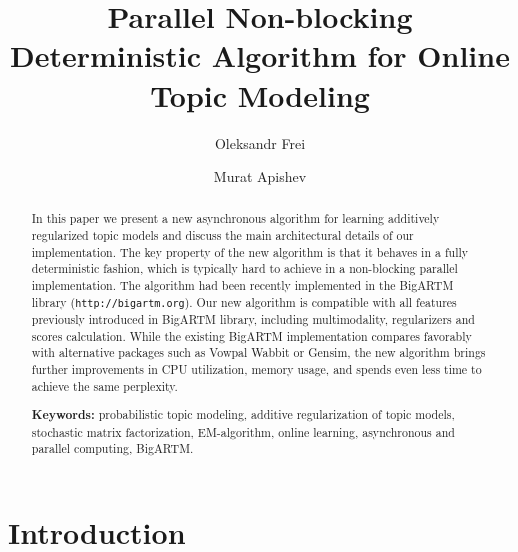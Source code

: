 \documentclass[russian,english]{llncs}
\begin{document}
\title{
    Parallel Non-blocking Deterministic Algorithm for Online Topic Modeling
}
\author{
    Oleksandr Frei
    \and
    Murat Apishev
}

\maketitle

\begin{abstract}
In this paper we present a new asynchronous algorithm for learning additively regularized topic models
and discuss the main architectural details of our implementation.
The key property of the new algorithm is that it behaves in a fully deterministic fashion,
which is typically hard to achieve in a non-blocking parallel implementation. The algorithm
had been
recently implemented in the BigARTM library (\texttt{http://bigartm.org}).
Our new algorithm is compatible with all features previously introduced in BigARTM library,
including multimodality, regularizers and scores calculation.
While the existing BigARTM implementation compares favorably
with alternative packages such as Vowpal Wabbit or Gensim,
the new algorithm brings further improvements in CPU utilization,
memory usage, and spends even less time to achieve the same perplexity.

\vspace{1em}
\textbf{Keywords:}
    probabilistic topic modeling,
    additive regularization of topic models,
    stochastic matrix factorization,
    EM-algorithm,
    online learning,
    asynchronous and parallel computing,
    BigARTM.
\end{abstract}

\section{Introduction}
%
\end{document}
